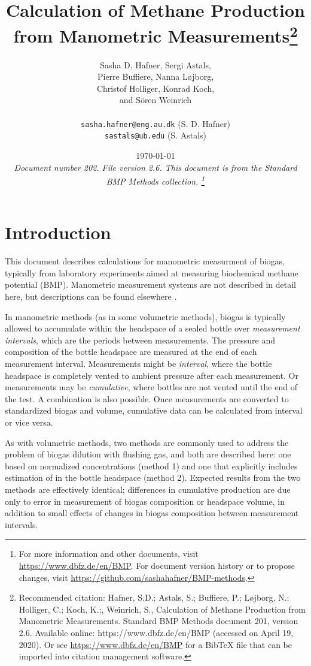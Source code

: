 \documentclass[]{article}
\title {Calculation of Methane Production from Manometric Measurements\footnote{
  Recommended citation: 
Hafner, S.D.; Astals, S.; Buffiere, P.; L\o jborg, N.; Holliger, C.; Koch, K.;, Weinrich, S., Calculation of Methane Production from Manometric Measurements. Standard BMP Methods document 201, version 2.6. Available online: https://www.dbfz.de/en/BMP (accessed on April 19, 2020).
\newline
  Or see \url{https://www.dbfz.de/en/BMP} for a BibTeX file that can be imported into citation management software.
}}
\author{Sasha D. Hafner, Sergi Astals, \\ Pierre Buffiere, Nanna L{\o}jborg, \\ Christof Holliger, Konrad Koch, \\ and S{\"o}ren Weinrich\\
\\
\texttt{sasha.hafner@eng.au.dk} (S. D. Hafner)\\
\texttt{sastals@ub.edu} (S. Astals)\\
}
\date{\today \\
\bigskip
\textit{
  Document number 202.
  File version 2.6. 
  This document is from the Standard BMP Methods collection.
    \footnote{For more information and other documents, visit \url{https://www.dbfz.de/en/BMP}. 
    For document version history or to propose changes, visit \url{https://github.com/sashahafner/BMP-methods}.}
}
}
\begin{document}
\maketitle

\section{Introduction}
This document describes calculations for manometric measurment of biogas, typically from laboratory experiments aimed at measuring biochemical methane potential (BMP).
Manometric measurement systems are not described in detail here, but descriptions can be found elsewhere \citep{rozziMethodsAssessingMicrobial2004,vdiFermentationOrganicMaterials2016}.

In manometric methods (as in some volumetric methods), biogas is typically allowed to accumulate within the headspace of a sealed bottle over \textit{measurement intervals}, which are the periods between measurements.
The pressure and composition of the bottle headspace are measured at the end of each measurement interval.
Measurements might be \textit{interval}, where the bottle headspace is completely vented to ambient pressure after each measurement.
Or measurements may be \textit{cumulative}, where bottles are not vented until the end of the test.
A combination is also possible.
Once measurements are converted to standardized biogas and  volume, cumulative data can be calculated from interval or vice versa.

As with volumetric methods, two methods are commonly used to address the problem of biogas dilution with flushing gas, and both are described here: one based on normalized  concentrations (method 1) and one that explicitly includes estimation of  in the bottle headspace (method 2).
Expected results from the two methods are effectively identical; differences in cumulative  production are due only to error in measurement of biogas composition or headspace volume, in addition to small effects of changes in biogas composition between measurement intervals.
\end{document}
